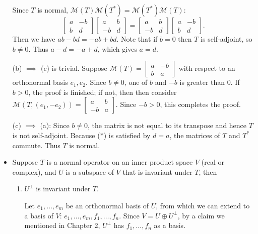 \documentclass{article}
\newcommand{\M}{\mathcal{M}}
\begin{document}
\begin{itemize}
    Since $T$ is normal, $\M(T)\M(T^*) = \M(T^*)\M(T)$:
    \begin{equation}\begin{bmatrix}
        a & -b \\ b & d
    \end{bmatrix} \begin{bmatrix}
        a & b \\ -b & d
    \end{bmatrix} = \begin{bmatrix}
         a & b \\ -b & d
    \end{bmatrix}\begin{bmatrix}
        a & -b \\ b & d
    \end{bmatrix}. \tag{$\ast$}
    \end{equation}
    Then we have $ab-bd=-ab+bd$. Note that if $b=0$ then $T$ is self-adjoint, so $b \neq 0$. Thus $a-d=-a+d$, which gives $a = d$.

    (b) $\implies$ (c) is trivial. Suppose $\M(T) = \begin{bmatrix}
        a & -b \\ b & a
    \end{bmatrix}$ with respect to an orthonormal basis $e_1,e_2$. Since $b \neq 0$, one of $b$ and $-b$ is greater than 0. If $b > 0$, the proof is finished; if not, then then consider $\M(T,(e_1,-e_2)) =
        \begin{bmatrix}
        a & b \\ -b & a
    \end{bmatrix}$. Since $-b > 0$, this completes the proof.

    (c) $\implies$ (a): Since $b \neq 0$, the matrix is not equal to its transpose and hence $T$ is not self-adjoint. Because ($\ast$) is satisfied by $d=a$, the matrices of $T$ and $T^*$ commute. Thus $T$ is normal.
    \item Suppose $T$ is a normal operator on an inner product space $V$ (real or complex), and $U$ is a subspace of $V$ that is invariant under $T$, then
    \begin{enumerate}[label=(\alph*)]
        \item $U^\perp$ is invariant under $T$.
        
        Let $e_1,\dots,e_m$ be an orthonormal basis of $U$, from which we can extend to a basis of $V$: $e_1,\dots,e_m,f_1,\dots,f_n$. Since $V = U \oplus U^\perp$, by a claim we mentioned in Chapter 2, $U^\perp$ has $f_1,\dots,f_n$ as a basis.


\end{enumerate}
\end{itemize}
\end{document}

